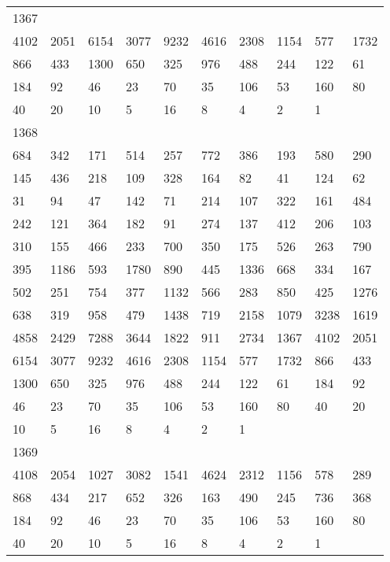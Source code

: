 \begin{longtable}{*{10}{l}}
1367&&&&&&&&&\\
4102& 2051& 6154& 3077& 9232& 4616& 2308& 1154& 577& 1732\\
866& 433& 1300& 650& 325& 976& 488& 244& 122& 61\\
184& 92& 46& 23& 70& 35& 106& 53& 160& 80\\
40& 20& 10& 5& 16& 8& 4& 2& 1& \\

1368&&&&&&&&&\\
684& 342& 171& 514& 257& 772& 386& 193& 580& 290\\
145& 436& 218& 109& 328& 164& 82& 41& 124& 62\\
31& 94& 47& 142& 71& 214& 107& 322& 161& 484\\
242& 121& 364& 182& 91& 274& 137& 412& 206& 103\\
310& 155& 466& 233& 700& 350& 175& 526& 263& 790\\
395& 1186& 593& 1780& 890& 445& 1336& 668& 334& 167\\
502& 251& 754& 377& 1132& 566& 283& 850& 425& 1276\\
638& 319& 958& 479& 1438& 719& 2158& 1079& 3238& 1619\\
4858& 2429& 7288& 3644& 1822& 911& 2734& 1367& 4102& 2051\\
6154& 3077& 9232& 4616& 2308& 1154& 577& 1732& 866& 433\\
1300& 650& 325& 976& 488& 244& 122& 61& 184& 92\\
46& 23& 70& 35& 106& 53& 160& 80& 40& 20\\
10& 5& 16& 8& 4& 2& 1& \\

1369&&&&&&&&&\\
4108& 2054& 1027& 3082& 1541& 4624& 2312& 1156& 578& 289\\
868& 434& 217& 652& 326& 163& 490& 245& 736& 368\\
184& 92& 46& 23& 70& 35& 106& 53& 160& 80\\
40& 20& 10& 5& 16& 8& 4& 2& 1& \\


\end{longtable}
